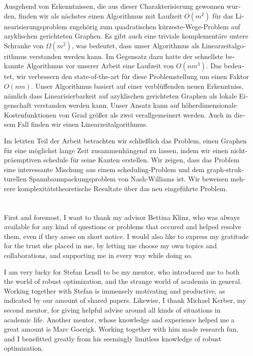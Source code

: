 \documentclass[twoside,openright,bibliography=totoc]{scrreprt}
\begin{document}
\begin{otherlanguage}{ngerman}
Ausgehend von Erkenntnissen, die aus dieser Charakterisierung gewonnen wurden, finden wir als nächstes einen Algorithmus mit Laufzeit $O(m^2)$ für das Linearisierungsproblem zugehörig zum quadratischen kürzeste-Wege-Problem auf azyklischen gerichteten Graphen. 
Es gibt auch eine triviale komplementäre untere Schranke von $\Omega(m^2)$, was bedeutet, dass unser Algorithmus als Linearzeitalgorithmus verstanden werden kann.
Im Gegensatz dazu hatte der schnellste bekannte Algorithmus vor unserer Arbeit eine Laufzeit von $O(nm^3)$. 
Das bedeutet, wir verbessern den state-of-the-art für diese Problemstellung um einen Faktor $O(nm)$. 
Unser Algorithmus basiert auf einer verblüffenden neuen Erkenntniss, nämlich dass Linearisierbarkeit auf azyklischen gerichteten Graphen als lokale Eigenschaft verstanden werden kann.
Unser Ansatz kann auf höherdimensionale Kostenfunktionen von Grad größer als zwei verallgemeinert werden. Auch in diesem Fall finden wir einen Linearzeitalgorithmus.


Im letzten Teil der Arbeit betrachten wir schließlich das Problem, einen Graphen für eine möglichst lange Zeit zusammenhängend zu lassen, indem wir einen nicht-präemptiven schedule für seine Kanten erstellen. Wir zeigen, dass das Problem eine interessante Mischung aus einem scheduling-Problem und dem graph-strukturellen Spannbaumpackungsproblem von Nash-Williams ist. Wir beweisen mehrere komplexitätstheoretische Resultate über das neu eingeführte Problem.


\end{otherlanguage}




\cleardoublepage

\chapter*{}

First and foremost, I want to thank my advisor Bettina Klinz, who was always available for any kind of questions or problems that occured and helped resolve them, even if they arose on short notice. I would also like to express my gratitude for the trust she placed in me, by letting me choose my own topics and collaborations, and supporting me in every way while doing so.

I am very lucky for Stefan Lendl to be my mentor, who introduced me to both the world of robust optimization, and the strange world of academia in general. Working together with Stefan is immensely motivating and productive, as indicated by our amount of shared papers. 
Likewise, I thank Michael Kerber, my second mentor, for giving helpful advise around all kinds of situations in academic life. 
Another mentor, whose knowledge and experience helped me a great amount is Marc Goerigk. Working together with him made research fun, and I benefitted greatly from his seemingly limitless knowledge of robust optimization.
\end{document}
